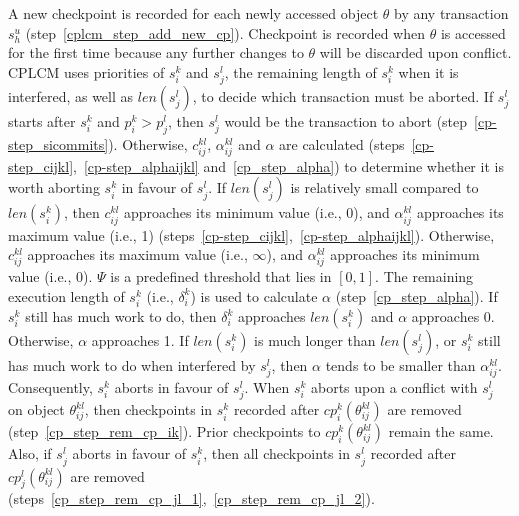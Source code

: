 A new checkpoint is recorded for each newly accessed object $\theta$ by any transaction $s_h^u$ (step~\ref{cplcm_step_add_new_cp}). Checkpoint is recorded when $\theta$ is accessed for the first time because any further changes to $\theta$ will be discarded upon conflict. CPLCM uses priorities of $s_i^k$ and $s_j^l$, the remaining length of $s_{i}^{k}$ when it is interfered, as well as $len(s_{j}^{l})$, to decide which transaction must be aborted. If $s_j^l$ starts after $s_i^k$ and $p_i^k > p_j^l$, then $s_{j}^l$ would be the transaction to abort (step~\ref{cp-step_sicommits}). Otherwise, $c_{ij}^{kl}$, $\alpha_{ij}^{kl}$ and $\alpha$ are calculated (steps~\ref{cp-step_cijkl},~\ref{cp-step_alphaijkl} and~\ref{cp_step_alpha}) to determine whether it is worth aborting $s_{i}^k$ in favour of $s_{j}^l$. If $len(s_j^l)$ is relatively small compared to $len(s_i^k)$, then $c_{ij}^{kl}$ approaches its minimum value (i.e., 0), and $\alpha_{ij}^{kl}$ approaches its maximum value (i.e., 1) (steps~\ref{cp-step_cijkl},~\ref{cp-step_alphaijkl}). Otherwise, $c_{ij}^{kl}$ approaches its maximum value (i.e., $\infty$), and $\alpha_{ij}^{kl}$ approaches its minimum value (i.e., 0). $\Psi$ is a predefined threshold that lies in $[0,1]$. The remaining execution length of $s_i^k$ (i.e., $\delta_i^k$) is used to calculate $\alpha$ (step~\ref{cp_step_alpha}). If $s_i^k$ still has much work to do, then $\delta_i^k$ approaches $len(s_i^k)$ and $\alpha$ approaches 0. Otherwise, $\alpha$ approaches 1. If $len(s_i^k)$ is much longer than $len(s_j^l)$, or $s_i^k$ still has much work to do when interfered by $s_j^l$, then $\alpha$ tends to be smaller than $\alpha_{ij}^{kl}$. Consequently, $s_i^k$ aborts in favour of $s_j^l$. When $s_i^k$ aborts upon a conflict with $s_j^l$ on object $\theta_{ij}^{kl}$, then checkpoints in $s_i^k$ recorded after $cp_i^k(\theta_{ij}^{kl})$ are removed (step~\ref{cp_step_rem_cp_ik}). Prior checkpoints to $cp_i^k(\theta_{ij}^{kl})$ remain the same. Also, if $s_j^l$ aborts in favour of $s_i^k$, then all checkpoints in $s_j^l$ recorded after $cp_j^l(\theta_{ij}^{kl})$ are removed (steps~\ref{cp_step_rem_cp_jl_1},~\ref{cp_step_rem_cp_jl_2}).
%
